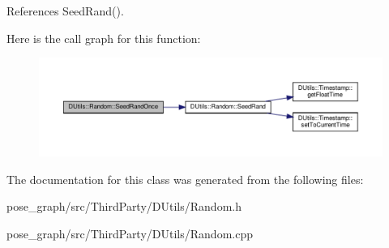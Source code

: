 References Seed\+Rand().

Here is the call graph for this function\+:\nopagebreak
\begin{figure}[H]
\begin{center}
\leavevmode
\includegraphics[width=350pt]{classDUtils_1_1Random_ad3652f5d105ca4f6f22696b64f2a4a5d_cgraph}
\end{center}
\end{figure}


The documentation for this class was generated from the following files\+:\begin{DoxyCompactItemize}
\item 
pose\+\_\+graph/src/\+Third\+Party/\+D\+Utils/Random.\+h\item 
pose\+\_\+graph/src/\+Third\+Party/\+D\+Utils/Random.\+cpp\end{DoxyCompactItemize}
